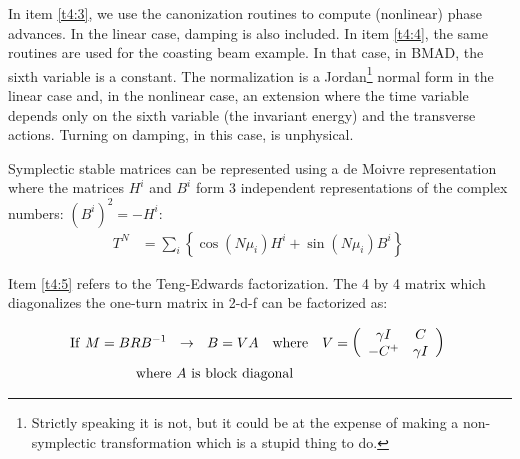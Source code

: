 \documentclass{hitec}     %
\begin{document}
{{{In item \ref{t4:3}, we use the canonization routines to compute (nonlinear) phase advances. In the linear case, damping is also included. In item \ref{t4:4}, the same routines are used for the coasting beam example. In that case, in BMAD, the sixth variable is a constant. The normalization is a Jordan\footnote{Strictly speaking it is not, but it could be at the expense of making a non-symplectic transformation which is a stupid thing to do.} normal form in the linear case and, in the nonlinear case, an extension where the time variable depends only on the sixth variable (the  invariant energy) and the transverse actions. Turning on damping, in this case, is unphysical.

Symplectic stable matrices can be represented using a de Moivre representation where the matrices $H^i$ and $B^i$ form 3 independent representations of the complex numbers: $ (B^i)^2=-H^i$:
%
\begin{align} {T}^{N} &=
\sum\limits_{i}^{} \left\{{\cos\left({N{\mu }_{i}}\right){H}^{i}+\sin\left({N{\mu }_{i}}\right){B}^{i}}\right\}\ \label{dmbn} \end{align}



Item \ref{t4:5} refers to the Teng-Edwards factorization. The 4 by 4 matrix which diagonalizes the one-turn matrix in 2-d-f can be factorized as:

%
\begin{align} {\rm I}{\rm f}~M=
BR{B}^{-1}\ \ &\rightarrow \ \ B=
VA~~~{\rm w}{\rm h}{\rm e}{\rm r}{\rm e}~~~V=
\left({\begin{array}{cc}\gamma I&C\\
-{C}^{+}&\gamma I\end{array}}\right) \label{eq:tefac}\  \\ ~{\rm w}{\rm h}{\rm e}{\rm r}{\rm e}~&A~{\rm i}{\rm s}~{\rm b}{\rm l}{\rm o}{\rm c}{\rm k}~{\rm d} {\rm i}{\rm a}{\rm g}{\rm o}{\rm n}{\rm a}{\rm l}\end{align}

}}}
\end{document}
